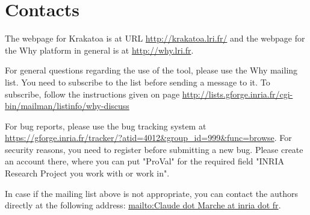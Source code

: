 \documentclass[a4paper,11pt,twoside,openright]{report}
\begin{document}
\section{Contacts}

The webpage for Krakatoa is at URL \url{http://krakatoa.lri.fr/} and
the webpage for the Why platform in general is at
\url{http://why.lri.fr}.

For general questions regarding the use of the tool, please use the
Why mailing list. You need to subscribe to the list before sending a
message to it. To subscribe, follow the instructions given on page
\url{http://lists.gforge.inria.fr/cgi-bin/mailman/listinfo/why-discuss}

For bug reports, please use the bug tracking system at
\url{https://gforge.inria.fr/tracker/?atid=4012&group_id=999&func=browse}. For
security reasons, you need to register before submitting a new
bug. Please create an account there, where you can put "ProVal" for
the required field "INRIA Research Project you work with or work in".

In case if the mailing list above is not appropriate, you can contact
the authors directly at the following address: \url{mailto:Claude dot
  Marche at inria dot fr}.

\cleardoublepage



%
\cleardoublepage

\printindex
\cleardoublepage
\end{document}
